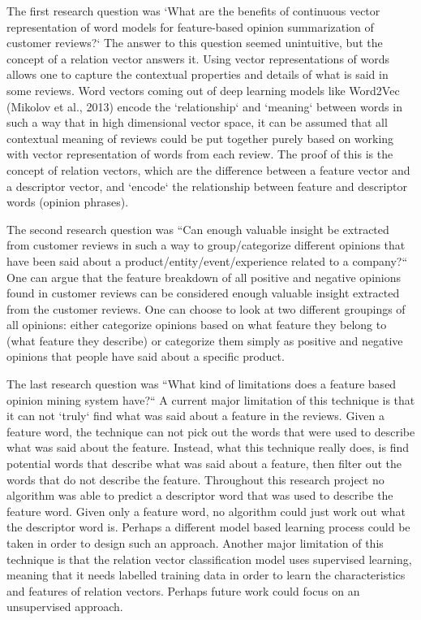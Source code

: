 \documentclass{sig-alternate}
\begin{document}
The first research question was `What are the benefits of continuous vector representation of word models for feature-based opinion summarization of customer reviews?` The answer to this question seemed unintuitive, but the concept of a relation vector answers it. Using vector representations of words allows one to capture the contextual properties and details of what is said in some reviews. Word vectors coming out of deep learning models like Word2Vec (Mikolov et al., 2013) encode the `relationship` and `meaning` between words in such a way that in high dimensional vector space, it can be assumed that all contextual meaning of reviews could be put together purely based on working with vector representation of words from each review. The proof of this is the concept of relation vectors, which are the difference between a feature vector and a descriptor vector, and `encode` the relationship between feature and descriptor words (opinion phrases).

The second research question was ``Can enough valuable insight be extracted from customer reviews in such a way to group/categorize different opinions that have been said about a product/entity/event/experience related to a company?``  One can argue that the feature breakdown of all positive and negative opinions found in customer reviews can be considered enough valuable insight extracted from the customer reviews. One can choose to look at two different groupings of all opinions: either categorize opinions based on what feature they belong to (what feature they describe) or categorize them simply as positive and negative opinions that people have said about a specific product.

The last research question was ``What kind of limitations does a feature based opinion mining system have?``  A current major limitation of this technique is that it can not `truly` find what was said about a feature in the reviews. Given a feature word, the technique can not pick out the words that were used to describe what was said about the feature. Instead, what this technique really does, is find potential words that describe what was said about a feature, then filter out the words that do not describe the feature. Throughout this research project no algorithm was able to predict a descriptor word that was used to describe the feature word. Given only a feature word, no algorithm could just work out what the descriptor word is. Perhaps a different model based learning process could be taken in order to design such an approach. Another major limitation of this technique is that the relation vector classification model uses supervised learning, meaning that it needs labelled training data in order to learn the characteristics and features of relation vectors. Perhaps future work could focus on an unsupervised approach.
\end{document}
